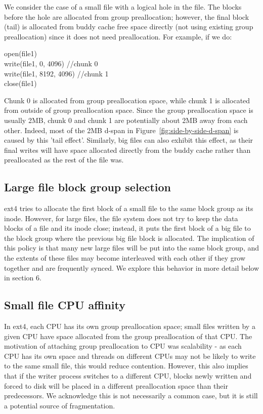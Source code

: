 \documentclass{acm_proc_article-sp}
\begin{document}
We consider the case of a small file with a logical hole in the file.  The blocks before the hole are allocated from group preallocation; however, the final block (tail) is allocated from buddy cache free space directly (not using existing group preallocation) since it does not need preallocation. For example, if we do:

open(file1)\\
write(file1, 0, 4096) //chunk 0\\
write(file1, 8192, 4096) //chunk 1\\
close(file1)

Chunk 0 is allocated from group preallocation space, while chunk 1 is allocated from outside of group preallocation space. Since the group preallocation space is usually 2MB, chunk 0 and chunk 1 are potentially about 2MB away from each other. Indeed, most of the 2MB d-span in Figure~\ref{fig:side-by-side-d-span} is caused by this 'tail effect'. Similarly, big files can also exhibit this effect, as their final writes will have space allocated directly from the buddy cache rather than preallocated as the rest of the file was.

\subsection{Large file block group selection}
ext4 tries to allocate the first block of a small file to the same block group as its inode. However, for large files, the file system does not try to keep the data blocks of a file and its inode close; instead, it puts the first block of a big file to the block group where the previous big file block is allocated. The implication of this policy is that many new large files will be put into the same block group, and the extents of these files may become interleaved with each other if they grow together and are frequently synced.  We explore this behavior in more detail below in section 6.

\subsection{Small file CPU affinity}
In ext4, each CPU has its own group preallocation space; small files written by a given CPU have space allocated from the group preallocation of that CPU.  The motivation of attaching group preallocation to CPU was scalability - as each CPU has its own space and threads on different CPUs may not be likely to write to the same small file, this would reduce contention. However, this also implies that if the writer process switches to a different CPU, blocks newly written and forced to disk will be placed in a different preallocation space than their predecessors. We acknowledge this is not necessarily a common case, but it is still a potential source of fragmentation.
\end{document}
